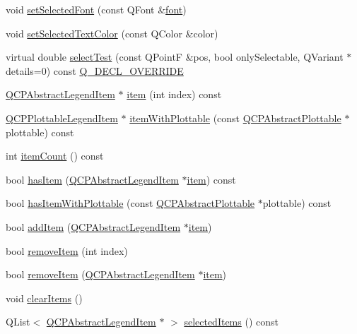 \begin{DoxyCompactItemize}
\item 
void \mbox{\hyperlink{class_q_c_p_legend_ab580a01c3c0a239374ed66c29edf5ad2}{set\+Selected\+Font}} (const Q\+Font \&\mbox{\hyperlink{class_q_c_p_legend_ae240104de3c3a4cfc0834dbaffa07ac9}{font}})
\item 
void \mbox{\hyperlink{class_q_c_p_legend_a7674dfc7a1f30e1abd1018c0ed45e0bc}{set\+Selected\+Text\+Color}} (const Q\+Color \&color)
\item 
virtual double \mbox{\hyperlink{class_q_c_p_legend_aa53507624491908fb3d1a514b1fc674e}{select\+Test}} (const Q\+PointF \&pos, bool only\+Selectable, Q\+Variant $\ast$details=0) const \mbox{\hyperlink{qcustomplot_8h_a42cc5eaeb25b85f8b52d2a4b94c56f55}{Q\+\_\+\+D\+E\+C\+L\+\_\+\+O\+V\+E\+R\+R\+I\+DE}}
\item 
\mbox{\hyperlink{class_q_c_p_abstract_legend_item}{Q\+C\+P\+Abstract\+Legend\+Item}} $\ast$ \mbox{\hyperlink{class_q_c_p_legend_acfe9694c45104a3359d3806ed366fcf7}{item}} (int index) const
\item 
\mbox{\hyperlink{class_q_c_p_plottable_legend_item}{Q\+C\+P\+Plottable\+Legend\+Item}} $\ast$ \mbox{\hyperlink{class_q_c_p_legend_a91e790002d8bf15a20628a8e8841e397}{item\+With\+Plottable}} (const \mbox{\hyperlink{class_q_c_p_abstract_plottable}{Q\+C\+P\+Abstract\+Plottable}} $\ast$plottable) const
\item 
int \mbox{\hyperlink{class_q_c_p_legend_a57ab86ab8b2a3762d4c1455eb5452c88}{item\+Count}} () const
\item 
bool \mbox{\hyperlink{class_q_c_p_legend_ad0f698e33db454a6c103b5206740e599}{has\+Item}} (\mbox{\hyperlink{class_q_c_p_abstract_legend_item}{Q\+C\+P\+Abstract\+Legend\+Item}} $\ast$\mbox{\hyperlink{class_q_c_p_legend_acfe9694c45104a3359d3806ed366fcf7}{item}}) const
\item 
bool \mbox{\hyperlink{class_q_c_p_legend_a4b90a442af871582df85c2bc13f91e88}{has\+Item\+With\+Plottable}} (const \mbox{\hyperlink{class_q_c_p_abstract_plottable}{Q\+C\+P\+Abstract\+Plottable}} $\ast$plottable) const
\item 
bool \mbox{\hyperlink{class_q_c_p_legend_a3ab274de52d2951faea45a6d975e6b3f}{add\+Item}} (\mbox{\hyperlink{class_q_c_p_abstract_legend_item}{Q\+C\+P\+Abstract\+Legend\+Item}} $\ast$\mbox{\hyperlink{class_q_c_p_legend_acfe9694c45104a3359d3806ed366fcf7}{item}})
\item 
bool \mbox{\hyperlink{class_q_c_p_legend_ac91595c3eaa746fe6321d2eb952c63bb}{remove\+Item}} (int index)
\item 
bool \mbox{\hyperlink{class_q_c_p_legend_a2aea4ec6da2d454dd0b241a254d65082}{remove\+Item}} (\mbox{\hyperlink{class_q_c_p_abstract_legend_item}{Q\+C\+P\+Abstract\+Legend\+Item}} $\ast$\mbox{\hyperlink{class_q_c_p_legend_acfe9694c45104a3359d3806ed366fcf7}{item}})
\item 
void \mbox{\hyperlink{class_q_c_p_legend_a24795c7250eb5214fcea16b7217b4dfb}{clear\+Items}} ()
\item 
Q\+List$<$ \mbox{\hyperlink{class_q_c_p_abstract_legend_item}{Q\+C\+P\+Abstract\+Legend\+Item}} $\ast$ $>$ \mbox{\hyperlink{class_q_c_p_legend_ac7d9e567d5c551e09cd9bcc4306c5532}{selected\+Items}} () const
\end{DoxyCompactItemize}

